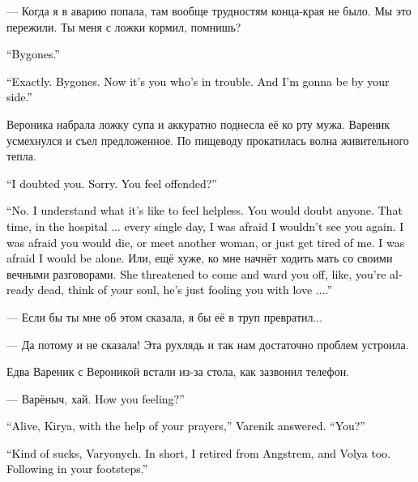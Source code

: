 \documentclass[a4paper,10pt,fleqn]{book}\usepackage{polyglossia}\setdefaultlanguage{english}\setotherlanguage{russian}\defaultfontfeatures{Ligatures=TeX,Mapping=tex-text} \usepackage{xcolor}\definecolor{lightgray}{HTML}{bbbbbb}\color{lightgray}\newcommand{\ml}[3]{\textcolor{black}{#3}}
\newcommand{\asterism}{\vspace{1em}{\centering\Large\bfseries$\ast~\ast~\ast$\par}\vspace{1em}}
\begin{document}
--- Когда я в аварию попала, там вообще трудностям конца-края не было.
Мы это пережили.
Ты меня с ложки кормил, помнишь?

\ml{$0$}
{--- Дело давнее.}
{``Bygones.''}

\ml{$0$}
{--- Именно.}
{``Exactly.}
\ml{$0$}
{Всё это позади.}
{Bygones.}
\ml{$0$}
{А сейчас трудности у тебя.}
{Now it's you who's in trouble.}
\ml{$0$}
{И я буду рядом.}
{And I'm gonna be by your side.''}

Вероника набрала ложку супа и аккуратно поднесла её ко рту мужа.
Вареник усмехнулся и съел предложенное.
По пищеводу прокатилась волна живительного тепла.

\ml{$0$}
{--- Я в тебе засомневался.}
{``I doubted you.}
\ml{$0$}
{Прости.}
{Sorry.}
\ml{$0$}
{Ты обиделась?}
{You feel offended?''}

\ml{$0$}
{--- Нет.}
{``No.}
\ml{$0$}
{Я знаю, каково чувствовать себя беспомощной.}
{I understand what it's like to feel helpless.}
\ml{$0$}
{Засомневаешься в ком угодно.}
{You would doubt anyone.}
\ml{$0$}
{Тогда, в больнице... я каждый день боялась, что тебя не дождусь.}
{That time, in the hospital ... every single day, I was afraid I wouldn't see you again.}
\ml{$0$}
{Что ты умрёшь, встретишь другую женщину, просто решишь, что я тебе надоела.}
{I was afraid you would die, or meet another woman, or just get tired of me.}
\ml{$0$}
{Что я просто останусь одна.}
{I was afraid I would be alone.}
Или, ещё хуже, ко мне начнёт ходить мать со своими вечными разговорами.
\ml{$0$}
{Она грозилась приехать и тебя отвадить, типа, ты уже труп, о душе думать надо, а он тебе голову любовью морочит...}
{She threatened to come and ward you off, like, you're already dead, think of your soul, he's just fooling you with love ....''}

--- Если бы ты мне об этом сказала, я бы её в труп превратил...

--- Да потому и не сказала!
Эта рухлядь и так нам достаточно проблем устроила.

\asterism

Едва Вареник с Вероникой встали из-за стола, как зазвонил телефон.

--- Варёныч, хай.
\ml{$0$}
{Как здравие?}
{How you feeling?''}

\ml{$0$}
{--- Жив, Киря, твоими молитвами, --- лаконично ответил Вареник.}
{``Alive, Kirya, with the help of your prayers,'' Varenik answered.}
\ml{$0$}
{--- Сам как?}
{``You?''}

\ml{$0$}
{--- Да как-то вот, Варёныч.}
{``Kind of sucks, Varyonych.}
\ml{$0$}
{Короче, ушёл я из <<Ангстрема>>, и Воля ушёл.}
{In short, I retired from Angstrem, and Volya too.}
\ml{$0$}
{По твоим стопам.}
{Following in your footsteps.''}
\end{document}
